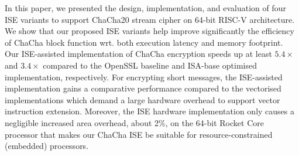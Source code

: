 In this paper, we presented the design, implementation, and evaluation of four ISE variants to support ChaCha20 stream cipher on 64-bit RISC-V architecture.
We show that our proposed ISE variants help improve significantly the efficiency of ChaCha block function wrt. both execution latency and memory footprint.  
Our ISE-assisted implementation of ChaCha encryption speeds up at least $5.4\times$ and $3.4\times$ compared to the OpenSSL baseline and ISA-base optimised implementation, respectively. 
For encrypting short messages, the ISE-assisted implementation gains a comparative performance compared to the vectorised implementations which demand a large hardware overhead to support vector instruction extension.
Moreover, the ISE hardware implementation only causes a negligible increased area overhead, about 2\%, on the 64-bit Rocket Core processor that makes our ChaCha ISE be suitable for resource-constrained (embedded) processors.




